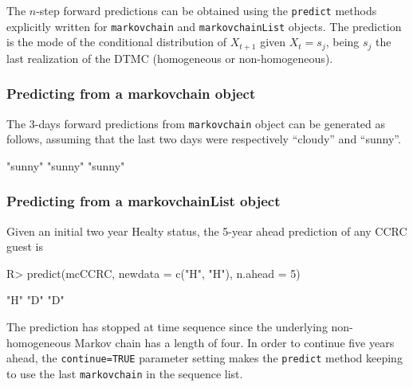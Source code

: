 \documentclass[article,nojss]{jss}
\begin{document}
The \(n\)-step forward predictions can be obtained using the \texttt{predict} methods explicitly written for \texttt{markovchain} and \texttt{markovchainList} objects. The prediction is the mode of the conditional distribution of \(X_{t+1}\) given \(X_{t}=s_{j}\), being \(s_{j}\) the last realization of the DTMC (homogeneous or non-homogeneous).

\hypertarget{predicting-from-a-markovchain-object}{%
\subsubsection{Predicting from a markovchain object}\label{predicting-from-a-markovchain-object}}

The 3-days forward predictions from \texttt{markovchain} object can be generated as follows, assuming that the last two days were respectively ``cloudy'' and ``sunny''.

\begin{CodeChunk}


\begin{CodeOutput}
[1] "sunny" "sunny" "sunny"
\end{CodeOutput}
\end{CodeChunk}

\hypertarget{predicting-from-a-markovchainlist-object}{%
\subsubsection{Predicting from a markovchainList object}\label{predicting-from-a-markovchainlist-object}}

Given an initial two year Healty status, the 5-year ahead prediction of any CCRC guest is

\begin{CodeChunk}

\begin{CodeInput}
R> predict(mcCCRC, newdata = c("H", "H"), n.ahead = 5)
\end{CodeInput}

\begin{CodeOutput}
[1] "H" "D" "D"
\end{CodeOutput}
\end{CodeChunk}

The prediction has stopped at time sequence since the underlying non-homogeneous Markov chain has a length of four. In order to continue five years ahead, the \texttt{continue=TRUE} parameter setting makes the \texttt{predict} method keeping to use the last \texttt{markovchain} in the sequence list.
\end{document}
